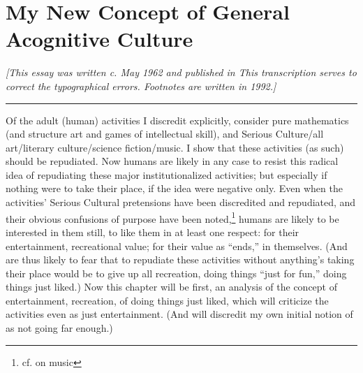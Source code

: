 \chapter{My New Concept of General Acognitive Culture}

{\itshape [This essay was written c. May 1962 and published in  This transcription serves to correct the typographical errors. Footnotes are written in 1992.]}

\plainbreak{2}

Of the adult (human) activities I discredit explicitly, consider pure mathematics (and structure art and games of intellectual skill), and Serious Culture\slash all art\slash literary culture\slash science fiction\slash music. I show that these activities (as such) should be repudiated. Now humans are likely in any case to resist this radical idea of repudiating these major institutionalized activities; but especially if nothing were to take their place, if the idea were negative only. Even when the activities' Serious Cultural pretensions have been discredited and repudiated, and their obvious confusions of purpose have been noted,\footnote{cf.  on music} humans are likely to be interested in them still, to like them in at least one respect: for their entertainment, recreational value; for their value as \enquote{ends,} in themselves. (And are thus likely to fear that to repudiate these activities without anything's taking their place would be to give up all recreation, doing things \enquote{just for fun,} doing things just liked.) Now this chapter will be first, an analysis of the concept of entertainment, recreation, of doing things just liked, which will criticize the activities even as just entertainment. (And will discredit my own initial notion of  as not going far enough.)

